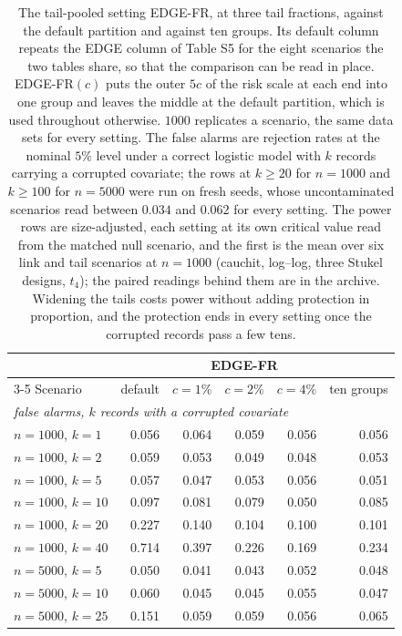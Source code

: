 \begin{table}[htbp]\centering\small
\caption{The tail-pooled setting EDGE-FR, at three tail fractions, against the default partition and
against ten groups. Its default column repeats the EDGE column of
Table S5 for the eight scenarios the two tables share, so that the
comparison can be read in place. EDGE-FR$(c)$ puts the outer $5c$ of the risk scale at each end into one group
and leaves the middle at the default partition, which is used throughout otherwise. $1000$ replicates
a scenario, the same data sets for every setting. The false alarms are rejection rates at the
nominal $5\%$ level under a correct logistic model with $k$ records carrying a corrupted
covariate; the rows at $k \ge 20$ for $n=1000$ and $k \ge 100$ for $n=5000$ were run on fresh
seeds, whose uncontaminated scenarios read between
$0.034$ and $0.062$ for every setting. The power rows are size-adjusted, each setting at its own
critical value read from the matched null scenario, and the first is the mean over six link and
tail scenarios at $n=1000$ (cauchit, log--log, three Stukel designs, $t_4$); the paired readings behind them are in the
archive. Widening the tails costs power without adding protection in proportion, and the
protection ends in every setting once the corrupted records pass a few tens.}
\label{tab:edgefr}
\begin{tabular}{lrrrrr}\hline
 & & \multicolumn{3}{c}{EDGE-FR} & \\
\cmidrule(lr){3-5}
Scenario & default & $c=1\%$ & $c=2\%$ & $c=4\%$ & ten groups \\ \hline
\multicolumn{6}{l}{\emph{false alarms, $k$ records with a corrupted covariate}} \\
\quad $n=1000$, $k=1$ & 0.056 & 0.064 & 0.059 & 0.056 & 0.056 \\
\quad $n=1000$, $k=2$ & 0.059 & 0.053 & 0.049 & 0.048 & 0.053 \\
\quad $n=1000$, $k=5$ & 0.057 & 0.047 & 0.053 & 0.056 & 0.051 \\
\quad $n=1000$, $k=10$ & 0.097 & 0.081 & 0.079 & 0.050 & 0.085 \\
\quad $n=1000$, $k=20$ & 0.227 & 0.140 & 0.104 & 0.100 & 0.101 \\
\quad $n=1000$, $k=40$ & 0.714 & 0.397 & 0.226 & 0.169 & 0.234 \\
\quad $n=5000$, $k=5$ & 0.050 & 0.041 & 0.043 & 0.052 & 0.048 \\
\quad $n=5000$, $k=10$ & 0.060 & 0.045 & 0.045 & 0.055 & 0.047 \\
\quad $n=5000$, $k=25$ & 0.151 & 0.059 & 0.059 & 0.056 & 0.065 \\

\end{tabular}
\end{table}

